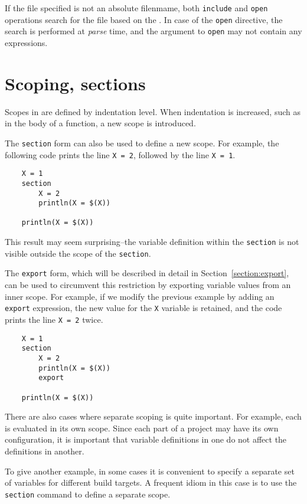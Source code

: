 If the file specified is not an absolute filenmame, both \verb+include+ and
\verb+open+ operations search for the file based on the
. In case of the \verb+open+ directive, the search is
performed at \emph{parse} time, and the argument to \verb+open+ may not
contain any expressions.

\section{Scoping, sections}
\label{section:section}

Scopes in  are defined by indentation level.  When indentation is
increased, such as in the body of a function, a new scope is introduced.

The \verb+section+ form can also be used to define a new scope.  For example, the following code
prints the line \verb+X = 2+, followed by the line \verb+X = 1+.

\begin{verbatim}
    X = 1
    section
        X = 2
        println(X = $(X))

    println(X = $(X))
\end{verbatim}

This result may seem surprising--the variable definition within the
\verb+section+ is not visible outside the scope of the \verb+section+.

The \verb+export+ form, which will be described in detail in
Section~\ref{section:export}, can be used to circumvent this restriction by
exporting variable values from an inner scope.
For example, if we modify the previous example
by adding an \verb+export+ expression, the new value for the \verb+X+
variable is retained, and the code prints the line \verb+X = 2+ twice.

\begin{verbatim}
    X = 1
    section
        X = 2
        println(X = $(X))
        export

    println(X = $(X))
\end{verbatim}

There are also cases where separate scoping is quite important.  For example,
each  is evaluated in its own scope.  Since each part of a project
may have its own configuration, it is important that variable definitions in one
 do not affect the definitions in another.

To give another example, in some cases it is convenient to specify a
separate set of variables for different build targets.  A frequent
idiom in this case is to use the \verb+section+ command to define a
separate scope.


